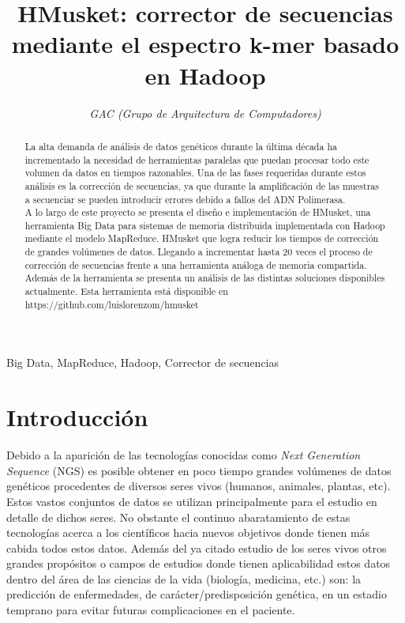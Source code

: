 \documentclass[conference]{IEEEtran}
\begin{document}
\title{HMusket: corrector de secuencias mediante el espectro k-mer basado en Hadoop}

\author{
	\textit{GAC (Grupo de Arquitectura de Computadores)}\\
}

\maketitle

\begin{abstract}
La alta demanda de análisis de datos genéticos durante la última década ha incrementado la necesidad de herramientas paralelas que puedan procesar todo este volumen da datos en tiempos razonables. Una de las fases requeridas durante estos análisis es la corrección de secuencias, ya que durante la amplificación de las muestras a secuenciar se pueden introducir errores debido a fallos del ADN Polimerasa.\\
A lo largo de este proyecto se presenta el diseño e implementación de HMusket, una herramienta Big Data para sistemas de memoria distribuida implementada con Hadoop mediante el modelo MapReduce. HMusket que logra reducir los tiempos de corrección de grandes volúmenes de datos. Llegando a incrementar hasta 20 veces el proceso de corrección de secuencias frente a una herramienta análoga de memoria compartida. Además de la herramienta se presenta un análisis de las distintas soluciones disponibles actualmente. Esta herramienta está disponible en https://github.com/luislorenzom/hmusket
\end{abstract}

\begin{IEEEkeywords}
Big Data, MapReduce, Hadoop, Corrector de secuencias
\end{IEEEkeywords}

\section{Introducción}
Debido a la aparición de las tecnologías conocidas como \textit{Next Generation Sequence} (NGS)\cite{ngs} es posible obtener en poco tiempo grandes volúmenes de datos genéticos procedentes de diversos seres vivos (humanos, animales, plantas, etc). Estos vastos conjuntos de datos se utilizan principalmente para el estudio en detalle de dichos seres. 
No obstante el continuo abaratamiento de estas tecnologías acerca a los científicos hacia nuevos objetivos donde tienen más cabida todos estos datos. Además del ya citado estudio de los seres vivos otros grandes propósitos o campos de estudios donde tienen aplicabilidad estos datos dentro del área de las ciencias de la vida (biología, medicina, etc.) son: la predicción de enfermedades, de carácter/predisposición genética, en un estadio temprano para evitar futuras complicaciones en el paciente. \\
\end{document}
